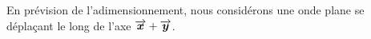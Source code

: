 %
\noindent En prévision de l'adimensionnement, nous considérons une onde plane se déplaçant le long de l'axe $\overrightarrow{\boldsymbol{x}}+\overrightarrow{\boldsymbol{y}}$. \\


